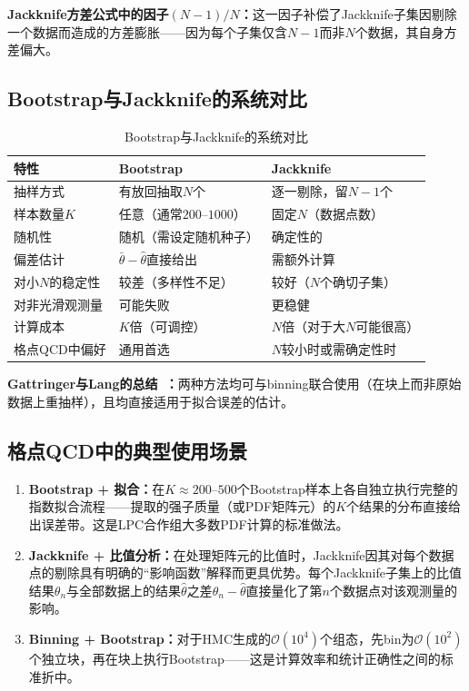 \documentclass[12pt,a4paper]{ctexart}
\theoremstyle{definition}
\begin{document}
\textbf{Jackknife方差公式中的因子$(N-1)/N$：}这一因子补偿了Jackknife子集因剔除一个数据而造成的方差膨胀——因为每个子集仅含$N-1$而非$N$个数据，其自身方差偏大。

\subsection{Bootstrap与Jackknife的系统对比}

\begin{table}[H]
\centering
\caption{Bootstrap与Jackknife的系统对比}
\label{tab:bs_vs_jk}
\begin{tabular}{p{3.5cm}p{4.5cm}p{4.5cm}}
\toprule
\textbf{特性} & \textbf{Bootstrap} & \textbf{Jackknife} \\
\midrule
抽样方式 & 有放回抽取$N$个 & 逐一剔除，留$N-1$个 \\
样本数量$K$ & 任意（通常$200\text{--}1000$） & 固定$N$（数据点数） \\
随机性 & 随机（需设定随机种子） & 确定性的 \\
偏差估计 & $\bar\theta - \hat\theta$直接给出 & 需额外计算 \\
对小$N$的稳定性 & 较差（多样性不足） & 较好（$N$个确切子集） \\
对非光滑观测量 & 可能失败 & 更稳健 \\
计算成本 & $K$倍（可调控） & $N$倍（对于大$N$可能很高） \\
格点QCD中偏好 & 通用首选 & $N$较小时或需确定性时 \\
\bottomrule
\end{tabular}
\end{table}

\textbf{Gattringer与Lang的总结~\cite{GattringerLang2010}：}两种方法均可与binning联合使用（在块上而非原始数据上重抽样），且均直接适用于拟合误差的估计。

\subsection{格点QCD中的典型使用场景}

\begin{enumerate}[nosep]
    \item \textbf{Bootstrap + 拟合：}在$K \approx 200\text{--}500$个Bootstrap样本上各自独立执行完整的指数拟合流程——提取的强子质量（或PDF矩阵元）的$K$个结果的分布直接给出误差带。这是LPC合作组大多数PDF计算的标准做法。
    \item \textbf{Jackknife + 比值分析：}在处理矩阵元的比值时，Jackknife因其对每个数据点的剔除具有明确的``影响函数''解释而更具优势。每个Jackknife子集上的比值结果$\theta_n$与全部数据上的结果$\hat\theta$之差$\theta_n - \hat\theta$直接量化了第$n$个数据点对该观测量的影响。
    \item \textbf{Binning + Bootstrap：}对于HMC生成的$\mathcal{O}(10^4)$个组态，先bin为$\mathcal{O}(10^2)$个独立块，再在块上执行Bootstrap——这是计算效率和统计正确性之间的标准折中。
\end{enumerate}
\end{document}
